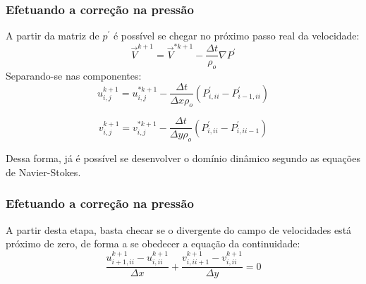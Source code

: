 \documentclass[xcolor=dvipsnames,10pt,aspectratio=169]{beamer}
\begin{document}
	\begin{frame}
		\frametitle{Efetuando a correção na pressão}
		A partir da matriz de $p^\prime$ é possível se chegar no próximo passo real da velocidade:
		\begin{equation}
			\vec{V}^{k+1}  = \vec{V}^{\ast{k + 1}} - \frac{\Delta t}{\rho_o} \nabla P^\prime
		\end{equation}
		Separando-se nas componentes:
		\begin{equation}
			u^{k+1}_{i, j}  = u^{\ast k+1}_{i, j} - \frac{\Delta t}{\Delta x \rho_o} \left(  P^{\prime}_{i , ii} -   P^{\prime}_{i - 1, ii}  \right)
		\end{equation}

		\begin{equation}
		v^{k+1}_{i, j}  = v^{\ast k+1}_{i, j} - \frac{\Delta t}{\Delta y \rho_o}  \left(  P^{\prime}_{i , ii} -   P^{\prime}_{i, ii-1}    \right)
		\end{equation}

		Dessa forma, já é possível se desenvolver o domínio dinâmico segundo as equações de Navier-Stokes.


	\end{frame}




	\begin{frame}
		\frametitle{Efetuando a correção na pressão}
		A partir desta etapa, basta checar se o divergente do campo de velocidades está próximo de zero, de forma a se obedecer a equação da continuidade:
		\begin{equation}
		\frac{u_{i + 1 , ii}^{k + 1} - u_{i, ii}^{k + 1} }{\Delta x} + \frac{v_{i , ii + 1}^{k + 1} - v_{i, ii}^{k + 1} }{\Delta y} = 0
		\end{equation}

	\end{frame}
\end{document}
